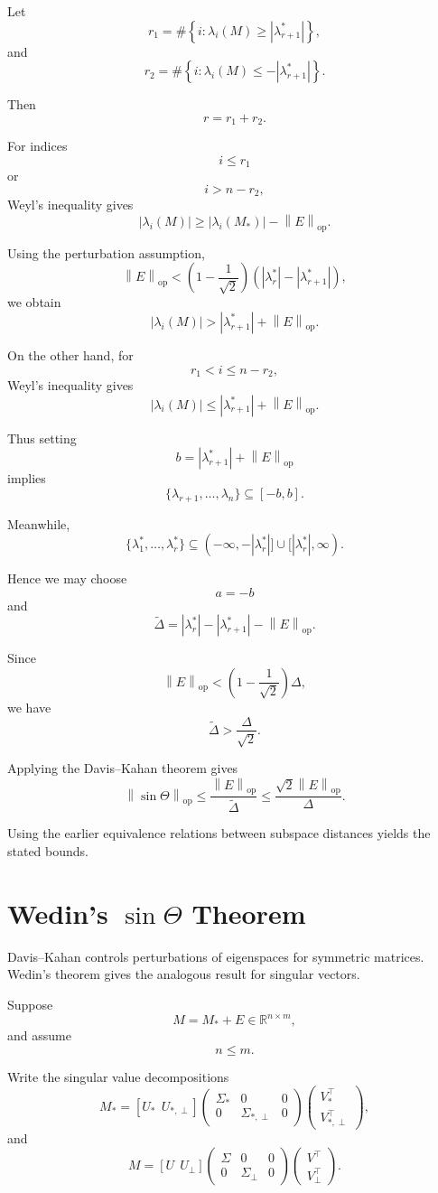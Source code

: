 \documentclass[12pt,oneside]{book}
\numberwithin{equation}{section}
\theoremstyle{definition}
\theoremstyle{plain}
\theoremstyle{remark}
\newcommand{\R}{\mathbb{R}}
\newcommand{\norm}[1]{\left\lVert #1 \right\rVert}
\begin{document}
Let
\[
r_1
=
\#\left\{
i:\lambda_i(M)\geq |\lambda_{r+1}^*|
\right\},
\]
and
\[
r_2
=
\#\left\{
i:\lambda_i(M)\leq -|\lambda_{r+1}^*|
\right\}.
\]

Then
\[
r=r_1+r_2.
\]

For indices
\[
i\leq r_1
\]
or
\[
i>n-r_2,
\]
Weyl's inequality gives
\[
|\lambda_i(M)|
\geq
|\lambda_i(M_*)|
-
\norm{E}_{\mathrm{op}}.
\]

Using the perturbation assumption,
\[
\norm{E}_{\mathrm{op}}
<
\left(
1-\frac{1}{\sqrt{2}}
\right)
(|\lambda_r^*|-|\lambda_{r+1}^*|),
\]
we obtain
\[
|\lambda_i(M)|
>
|\lambda_{r+1}^*|
+
\norm{E}_{\mathrm{op}}.
\]

On the other hand, for
\[
r_1<i\leq n-r_2,
\]
Weyl's inequality gives
\[
|\lambda_i(M)|
\leq
|\lambda_{r+1}^*|
+
\norm{E}_{\mathrm{op}}.
\]

Thus setting
\[
b
=
|\lambda_{r+1}^*|
+
\norm{E}_{\mathrm{op}}
\]
implies
\[
\{\lambda_{r+1},\dots,\lambda_n\}
\subseteq
[-b,b].
\]

Meanwhile,
\[
\{\lambda_1^*,\dots,\lambda_r^*\}
\subseteq
(-\infty,-|\lambda_r^*|]
\cup
[|\lambda_r^*|,\infty).
\]

Hence we may choose
\[
a=-b
\]
and
\[
\widetilde{\Delta}
=
|\lambda_r^*|
-
|\lambda_{r+1}^*|
-
\norm{E}_{\mathrm{op}}.
\]

Since
\[
\norm{E}_{\mathrm{op}}
<
\left(
1-\frac{1}{\sqrt{2}}
\right)\Delta,
\]
we have
\[
\widetilde{\Delta}
>
\frac{\Delta}{\sqrt{2}}.
\]

Applying the Davis--Kahan theorem gives
\[
\norm{\sin\Theta}_{\mathrm{op}}
\leq
\frac{\norm{E}_{\mathrm{op}}}{\widetilde{\Delta}}
\leq
\frac{\sqrt{2}\norm{E}_{\mathrm{op}}}{\Delta}.
\]

Using the earlier equivalence relations between subspace distances yields the stated bounds.

\section{Wedin's $\sin\Theta$ Theorem}

Davis--Kahan controls perturbations of eigenspaces for symmetric matrices. Wedin's theorem gives the analogous result for singular vectors.

Suppose
\[
M=M_*+E\in\R^{n\times m},
\]
and assume
\[
n\leq m.
\]

Write the singular value decompositions
\[
M_*
=
[U_*\ \ U_{*,\perp}]
\begin{pmatrix}
\Sigma_* & 0 & 0\\
0 & \Sigma_{*,\perp} & 0
\end{pmatrix}
\begin{pmatrix}
V_*^\top\\
V_{*,\perp}^\top
\end{pmatrix},
\]
and
\[
M
=
[U\ \ U_\perp]
\begin{pmatrix}
\Sigma & 0 & 0\\
0 & \Sigma_\perp & 0
\end{pmatrix}
\begin{pmatrix}
V^\top\\
V_\perp^\top
\end{pmatrix}.
\]
\end{document}
